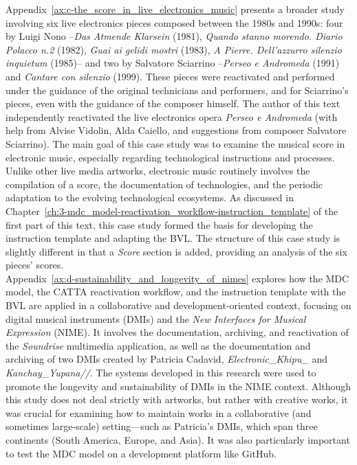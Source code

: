 Appendix~\ref{ax:c-the_score_in_live_electronics_music} presents a broader study involving six live electronics pieces composed between the 1980s and 1990s: four by Luigi Nono –\textit{Das Atmende Klarsein} (1981), \textit{Quando stanno morendo. Diario Polacco n.2} (1982), \textit{Guai ai gelidi mostri} (1983), \textit{A Pierre. Dell’azzurro silenzio inquietum} (1985)– and two by Salvatore Sciarrino –\textit{Perseo e Andromeda} (1991) and \textit{Cantare con silenzio} (1999). These pieces were reactivated and performed under the guidance of the original technicians and performers, and for Sciarrino’s pieces, even with the guidance of the composer himself. The author of this text independently reactivated the live electronics opera \textit{Perseo e Andromeda} (with help from Alvise Vidolin, Alda Caiello, and suggestions from composer Salvatore Sciarrino). The main goal of this case study was to examine the musical score in electronic music, especially regarding technological instructions and processes. Unlike other live media artworks, electronic music routinely involves the compilation of a score, the documentation of technologies, and the periodic adaptation to the evolving technological ecosystems. As discussed in Chapter~\ref{ch:3-mdc_model-reactivation_workflow-instruction_template} of the first part of this text, this case study formed the basis for developing the instruction template and adapting the BVL. The structure of this case study is slightly different in that a \textit{Score} section is added, providing an analysis of the six pieces’ scores.\\
Appendix~\ref{ax:d-sustainability_and_longevity_of_nimes} explores how the MDC model, the CATTA reactivation workflow, and the instruction template with the BVL are applied in a collaborative and development-oriented context, focusing on digital musical instruments (DMIs) and the \textit{New Interfaces for Musical Expression} (NIME). It involves the documentation, archiving, and reactivation of the \textit{Soundrise} multimedia application, as well as the documentation and archiving of two DMIs created by Patricia Cadavid, \textit{Electronic\_Khipu\_} and \textit{Kanchay\_Yupana//}. The systems developed in this research were used to promote the longevity and sustainability of DMIs in the NIME context. Although this study does not deal strictly with artworks, but rather with creative works, it was crucial for examining how to maintain works in a collaborative (and sometimes large-scale) setting—such as Patricia’s DMIs, which span three continents (South America, Europe, and Asia). It was also particularly important to test the MDC model on a development platform like GitHub.
